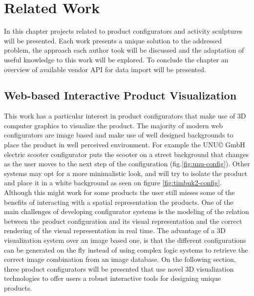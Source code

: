 \documentclass[medieninformatik-arbeit.tex]{subfiles}
\begin{document}
\section{Related Work}
\label{ch:related}
In this chapter projects related to product configurators and activity
sculptures will be presented. Each work presents a unique solution to the addressed problem, 
the approach each author took will be discussed and the adaptation of useful knowledge to this
work will be explored. To conclude the chapter an overview of available vendor
API for data import will be presented. 

\subsection{Web-based Interactive Product Visualization}
This work has a particular interest in product configurators that make use of 3D
computer graphics to visualize the product. The majority of modern web
configurators are image based and make use of well designed backgrounds to place the
product in well perceived environment. For example the UNU\copyright{} GmbH electric scooter
configurator puts the scooter on a street background that
changes as the user moves to the next step of the configuration (fig.\ref{fig:unu-config}). 
Other systems may opt for a more minimalistic look, and will try to isolate the
product and place it in a white background as seen on
figure \ref{fig:timbuk2-config}. 
Although this might work for some products the user still misses some of the benefits of
interacting with a spatial representation the products\cite{vande2009analyzing}.
One of the main challenges of developing  configurator systems is the modeling
of the relation between the product configuration and its visual representation
and the correct rendering of the visual representation in real
time\cite{feliceinteractive}. The advantage of a 3D visualization system
over an image based one, is that the different configurations can be generated on
the fly instead of using complex logic systems to retrieve the correct image
combination from an image database. On the following section, three product
configurators will be presented that use novel 3D visualization technologies to
offer users a robust interactive tools for designing unique products.
\end{document}
